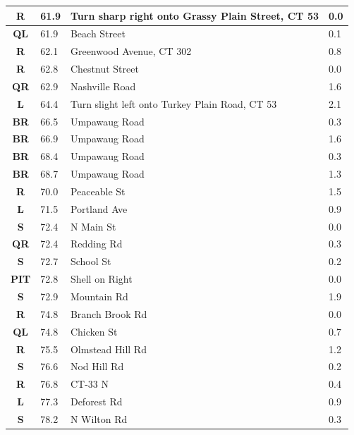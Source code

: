 \documentclass[11pt]{article}
\begin{document}
\begin{center}
\begin{supertabular}{|c|p{0.30in}|p{2.25in}|l|}
 \textbf{R} &  61.9 & Turn sharp right onto Grassy Plain Street, CT 53 &   0.0 \\ \hline
 \textbf{QL} &  61.9 & Beach Street &   0.1 \\ \hline
{} \textbf{R} &  62.1 & Greenwood Avenue, CT 302 &   0.8 \\ \hline
{} \textbf{R} &  62.8 & Chestnut Street &   0.0 \\ \hline
{} \textbf{QR} &  62.9 & Nashville Road &   1.6 \\ \hline
 \textbf{L} &  64.4 & Turn slight left onto Turkey Plain Road, CT 53 &   2.1 \\ \hline
{} \textbf{BR} &  66.5 & Umpawaug Road &   0.3 \\ \hline
{} \textbf{BR} &  66.9 & Umpawaug Road &   1.6 \\ \hline
{} \textbf{BR} &  68.4 & Umpawaug Road &   0.3 \\ \hline
{} \textbf{BR} &  68.7 & Umpawaug Road &   1.3 \\ \hline
{} \textbf{R} &  70.0 & Peaceable St &   1.5 \\ \hline
 \textbf{L} &  71.5 & Portland Ave &   0.9 \\ \hline
 \textbf{S} &  72.4 & N Main St &   0.0 \\ \hline
{} \textbf{QR} &  72.4 & Redding Rd &   0.3 \\ \hline
 \textbf{S} &  72.7 & School St &   0.2 \\ \hline
{} \textbf{PIT} &  72.8 & Shell on Right &   0.0 \\ \hline
 \textbf{S} &  72.9 & Mountain Rd &   1.9 \\ \hline
{} \textbf{R} &  74.8 & Branch Brook Rd &   0.0 \\ \hline
 \textbf{QL} &  74.8 & Chicken St &   0.7 \\ \hline
{} \textbf{R} &  75.5 & Olmstead Hill Rd &   1.2 \\ \hline
 \textbf{S} &  76.6 & Nod Hill Rd &   0.2 \\ \hline
{} \textbf{R} &  76.8 & CT-33 N &   0.4 \\ \hline
 \textbf{L} &  77.3 & Deforest Rd &   0.9 \\ \hline
 \textbf{S} &  78.2 & N Wilton Rd &   0.3 \\ \hline

\end{supertabular}
\end{center}
\end{document}
